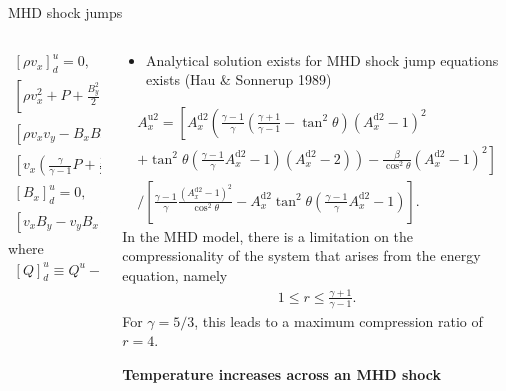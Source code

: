 \documentclass[10pt,aspectratio=169,usenames,dvipsnames]{beamer}
\begin{document}
\begin{frame}{MHD shock jumps}
\begin{columns}
\begin{column}{0.45\textwidth}
\begin{gather}
    \left[\rho v_x  \right]^u _d = 0,  \\
    \left[\rho v_x^2 +P +\frac{B_y^2}{2} \right]^u _d = 0, \\
    \left[\rho v_x v_y -B_x B_y \right]^u _d = 0, \\
    \left[ v_{x} \left( \frac{\gamma}{\gamma -1} P + \frac{1}{2} \rho v^2 \right) \right]^u _d =0, \\
    \left[B_x \right]^u _d = 0, \\
    \left[v_x B_y -v_y B_x   \right]^u _d = 0, 
\end{gather}
where
\begin{gather}
    \left[ Q \right]^u _d \equiv Q^u - Q^d,
\end{gather}
\end{column}
\begin{column}{0.55\textwidth}
\footnotesize
\begin{itemize}
    \item Analytical solution exists for MHD shock jump equations exists (Hau \& Sonnerup 1989) 
\end{itemize}
\begin{gather}
    A_x ^{\text{u}2} = \left[ A_x ^{\text{d}2} \left( \frac{\gamma-1}{\gamma} \left( \frac{\gamma+1}{\gamma -1} -\tan ^2 \theta \right) \left(A_x ^{\text{d}2} -1 \right) ^2 \right. \right. \nonumber\\ 
    + \left. \left. \tan ^2 \theta \left( \frac{\gamma-1}{\gamma} A_x ^{\text{d}2} -1 \right) \left(A_x ^{\text{d}2} -2 \right) \right) - \frac{\beta}{ \cos ^2 \theta } \left( A_x ^{\text{d}2} -1 \right) ^2 \right]  \nonumber\\
    / \left[ \frac{\gamma -1}{\gamma} \frac{\left( A_x ^{\text{d}2}-1 \right) ^2}{ \cos ^2 \theta } - A_ x ^{\text{d}2} \tan ^2 \theta \left( \frac{\gamma -1}{\gamma} A_x ^{\text{d}2} -1 \right) \right].
\end{gather}
In the MHD model, there is a limitation on the compressionality of the system that arises from the energy equation, namely 
\begin{gather}
    1 \leq r \leq \frac{\gamma +1}{\gamma -1}.
\end{gather}
For $\gamma =5/3$, this leads to a maximum compression ratio of $r=4$.

\textbf{Temperature increases across an MHD shock}
\end{column}
\end{columns}
\end{frame}
\end{document}
